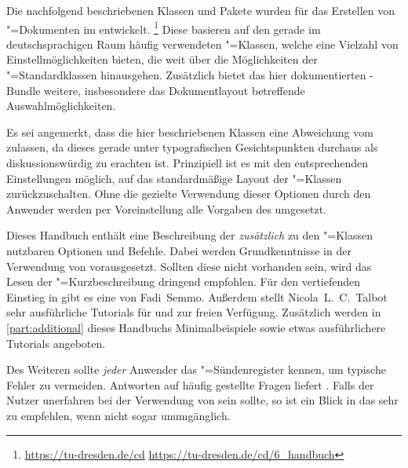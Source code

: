 \addchap[tocentry={}]{\prefacename}
Die nachfolgend beschriebenen Klassen und Pakete wurden für das Erstellen von 
"=Dokumenten im \TUDCD entwickelt.%
\footnote{%
  \url{https://tu-dresden.de/cd}\qquad
  \url{https://tu-dresden.de/cd/6_handbuch}%
}
Diese basieren auf den gerade im deutschsprachigen Raum häufig verwendeten 
\KOMAScript"=Klassen, welche eine Vielzahl von Einstellmöglichkeiten bieten, 
die weit über die Möglichkeiten der "=Standardklassen 
hinausgehen. Zusätzlich bietet das hier dokumentierten \TUDScript-Bundle 
weitere, insbesondere das Dokumentlayout betreffende Auswahlmöglichkeiten.

Es sei angemerkt, dass die hier beschriebenen Klassen eine Abweichung vom 
\TUDCD zulassen, da dieses gerade unter typografischen Gesichtspunkten 
durchaus als diskussionswürdig zu erachten ist. Prinzipiell ist es mit den 
entsprechenden Einstellungen möglich, auf das standardmäßige Layout der 
\KOMAScript"=Klassen zurückzuschalten. Ohne die gezielte Verwendung dieser 
Optionen durch den Anwender werden per Voreinstellung alle Vorgaben des \CDs 
umgesetzt.

Dieses Handbuch enthält eine Beschreibung der \emph{zusätzlich} zu den 
\KOMAScript"=Klassen nutzbaren Optionen und Befehle. Dabei werden 
Grundkenntnisse in der Verwendung von  vorausgesetzt. Sollten 
diese nicht vorhanden sein, wird das Lesen der "=Kurzbeschreibung
dringend empfohlen. Für den vertiefenden Einstieg in  gibt es 
eine  von 
Fadi~Semmo. Außerdem stellt Nicola~L.~C.~Talbot sehr ausführliche Tutorials für 
und  zur 
freien Verfügung. Zusätzlich werden in \autoref{part:additional} dieses 
Handbuchs Minimalbeispiele sowie etwas ausführlichere Tutorials angeboten.

Des Weiteren sollte \emph{jeder} Anwender das "=Sündenregister 
kennen, um typische Fehler zu vermeiden. Antworten auf häufig gestellte Fragen 
liefert . Falls der 
Nutzer unerfahren bei der Verwendung von \KOMAScript{} sein sollte, so ist ein 
Blick in das  sehr zu empfehlen, wenn nicht 
sogar unumgänglich.

